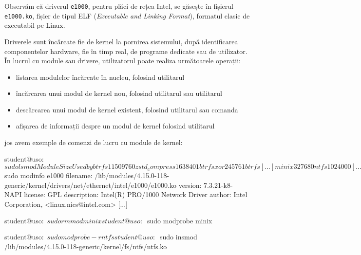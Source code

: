 
Observăm că driverul \texttt{e1000}, pentru plăci de rețea Intel, se găsește în fișierul
\texttt{e1000.ko}, fișier de tipul ELF  (\textit{Executable
and Linking Format}), formatul clasic de executabil pe Linux.

Driverele sunt încărcate fie de kernel la pornirea sistemului, după
identificarea componentelor hardware, fie în timp real, de programe dedicate sau
de utilizator. În lucrul cu module sau drivere, utilizatorul poate realiza
următoarele operații:

\begin{itemize}
  \item listarea modulelor încărcate în nucleu, folosind utilitarul 
  \item încărcarea unui modul de kernel nou, folosind utilitarul  sau
    utilitarul 
  \item descărcarea unui modul de kernel existent, folosind utilitarul 
    sau comanda 
  \item afișarea de informații despre un modul de kernel folosind utilitarul 
\end{itemize}

 jos avem exemple de comenzi de lucru cu module de kernel:

\begin{screen}[caption={Lucrul cu module de kernel în Linux},label={lst:boot:modules}]
student@uso:~$ sudo lsmod
Module                  Size  Used by
btrfs                1150976  0
zstd_compress         163840  1 btrfs
xor                    24576  1 btrfs
[...]
minix                  32768  0
ntfs                  102400  0
[...]

student@uso:~$ sudo modinfo e1000
filename:       /lib/modules/4.15.0-118-generic/kernel/drivers/net/ethernet/intel/e1000/e1000.ko
version:        7.3.21-k8-NAPI
license:        GPL
description:    Intel(R) PRO/1000 Network Driver
author:         Intel Corporation, <linux.nics@intel.com>
[...]

student@uso:~$ sudo rmmod minix

student@uso:~$ sudo modprobe minix

student@uso:~$ sudo modprobe -r ntfs

student@uso:~$ sudo insmod /lib/modules/4.15.0-118-generic/kernel/fs/ntfs/ntfs.ko
\end{screen}

